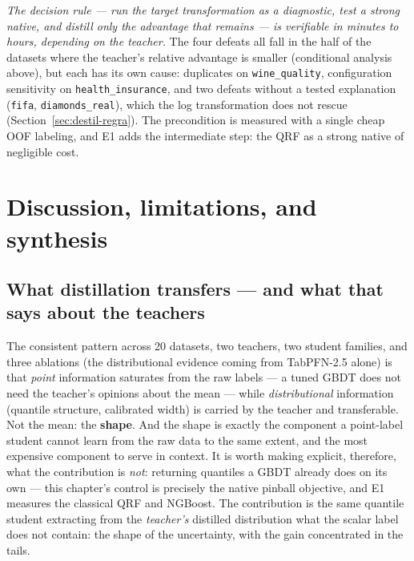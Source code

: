 \emph{The decision rule --- run the target transformation as a
diagnostic, test a strong native, and
distill only the advantage that remains --- is verifiable in
minutes to hours, depending on the teacher.} The four defeats all fall in the half of the datasets
where the teacher's relative advantage is smaller (conditional
analysis above), but each has its own cause: duplicates on
\texttt{wine\_quality}, configuration sensitivity on
\texttt{health\_\allowbreak insurance}, and two defeats without a
tested explanation (\texttt{fifa},
\texttt{diamonds\_\allowbreak real}), which the log transformation
does not rescue (Section~\ref{sec:destil-regra}). The
precondition is measured with a single cheap OOF labeling, and E1
adds the intermediate step: the QRF as a strong native of
negligible cost.

\section{Discussion, limitations, and synthesis}
\label{sec:destil-discussao}

\subsection{What distillation transfers --- and what that says about
the teachers}
\label{sec:destil-transfere}

The consistent pattern across 20 datasets, two teachers, two student
families, and three ablations (the distributional evidence coming
from TabPFN-2.5 alone) is that \emph{point} information
saturates from the raw labels --- a tuned GBDT does not need the
teacher's opinions about the mean --- while \emph{distributional}
information (quantile structure, calibrated width) is carried by the
teacher and transferable. Not the mean: the \textbf{shape}. And the
shape is exactly the component a point-label student cannot learn
from the raw data to the same extent, and the most expensive
component to serve in context. It is worth making explicit,
therefore, what the contribution is \emph{not}: returning quantiles
a GBDT already does on its own --- this chapter's control is
precisely the native pinball objective, and E1 measures the
classical QRF and NGBoost. The contribution is the same quantile
student extracting from the \emph{teacher's} distilled distribution
what the scalar label does not contain: the shape of the
uncertainty, with the gain concentrated in the tails.


